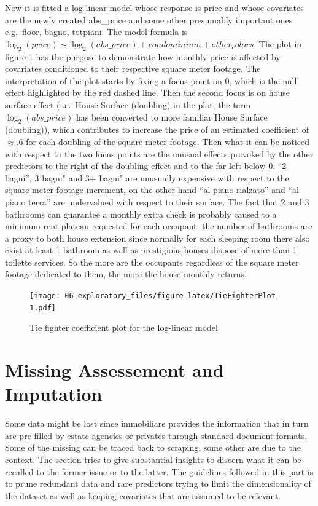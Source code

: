 \documentclass[
  12pt,
  a4paper,
  oneside]{book}
\theoremstyle{definition}
\theoremstyle{definition}
\theoremstyle{definition}
\theoremstyle{remark}
\begin{document}
Now it is fitted a log-linear model whose response is price and whose covariates are the newly created abs\_price and some other presumably important ones e.g.~floor, bagno, totpiani. The model formula is \(\log_{2}(price) \sim \log_{2}(abs\_price) + condominium + other_colors\).
The plot in figure \ref{fig:TieFighterPlot} has the purpose to demonstrate how monthly price is affected by covariates conditioned to their respective square meter footage. The interpretation of the plot starts by fixing a focus point on 0, which is the null effect highlighted by the red dashed line. Then the second focus is on house surface effect (i.e.~House Surface (doubling) in the plot, the term \(\log_{2}(abs\_price)\) has been converted to more familiar House Surface (doubling)), which contributes to increase the price of an estimated coefficient of \(\approx .6\) for each doubling of the square meter footage. Then what it can be noticed with respect to the two focus points are the unusual effects provoked by the other predictors to the right of the doubling effect and to the far left below 0. ``2 bagni'', 3 bagni" and 3+ bagni" are unusually expensive with respect to the square meter footage increment, on the other hand ``al piano rialzato'' and ``al piano terra'' are undervalued with respect to their surface. The fact that 2 and 3 bathrooms can guarantee a monthly extra check is probably caused to a minimum rent plateau requested for each occupant. the number of bathrooms are a proxy to both house extension since normally for each sleeping room there also exist at least 1 bathroom as well as prestigious houses dispose of more than 1 toilette services. So the more are the occupants regardless of the square meter footage dedicated to them, the more the house monthly returns.

\begin{figure}
\centering
\texttt{[image: 06-exploratory\_files/figure-latex/TieFighterPlot-1.pdf]}
\caption{\label{fig:TieFighterPlot}Tie fighter coefficient plot for the log-linear model}
\end{figure}

\hypertarget{missassimp}{%
\section{Missing Assessement and Imputation}\label{missassimp}}

Some data might be lost since immobiliare provides the information that in turn are pre filled by estate agencies or privates through standard document formats. Some of the missing can be traced back to scraping, some other are due to the context. The section tries to give substantial insights to discern what it can be recalled to the former issue or to the latter. The guidelines followed in this part is to prune redundant data and rare predictors trying to limit the dimensionality of the dataset as well as keeping covariates that are assumed to be relevant.
\end{document}
